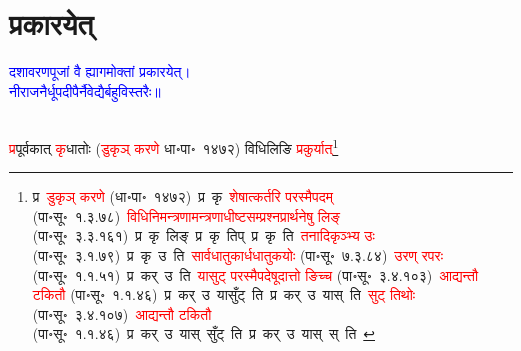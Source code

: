 \section[प्रकारयेत्]{प्रकारयेत्}
\centering\textcolor{blue}{दशावरणपूजां वै ह्यागमोक्तां प्रकारयेत्।\nopagebreak\\
नीराजनैर्धूपदीपैर्नैवेद्यैर्बहुविस्तरैः॥}\nopagebreak\\
\\
\fontsize{14}{21}\selectfont\begin{sloppypar}\justifying\noindent\hspace{10mm} \textcolor{red}{प्र}\-पूर्वकात् \textcolor{red}{कृ}\-धातोः (\textcolor{red}{डुकृञ् करणे} धा॰पा॰~१४७२) विधिलिङि \textcolor{red}{प्रकुर्यात्}\footnote{प्र~\textcolor{red}{डुकृञ् करणे} (धा॰पा॰~१४७२)~\arrow प्र~कृ~\arrow \textcolor{red}{शेषात्कर्तरि परस्मैपदम्} (पा॰सू॰~१.३.७८)~\arrow \textcolor{red}{विधि\-निमन्‍त्रणामन्‍त्रणाधीष्‍ट\-सम्प्रश्‍न\-प्रार्थनेषु लिङ्} (पा॰सू॰~३.३.१६१)~\arrow प्र~कृ~लिङ्~\arrow प्र~कृ~तिप्~\arrow प्र~कृ~ति~\arrow \textcolor{red}{तनादि\-कृञ्भ्य उः} (पा॰सू॰~३.१.७९)~\arrow प्र~कृ~उ~ति~\arrow \textcolor{red}{सार्वधातुकार्ध\-धातुकयोः} (पा॰सू॰~७.३.८४)~\arrow \textcolor{red}{उरण् रपरः} (पा॰सू॰~१.१.५१)~\arrow प्र~कर्~उ~ति~\arrow \textcolor{red}{यासुट् परस्मैपदेषूदात्तो ङिच्च} (पा॰सू॰~३.४.१०३)~\arrow \textcolor{red}{आद्यन्तौ टकितौ} (पा॰सू॰~१.१.४६)~\arrow प्र~कर्~उ~यासुँट्~ति~\arrow प्र~कर्~उ~यास्~ति~\arrow \textcolor{red}{सुट् तिथोः} (पा॰सू॰~३.४.१०७)~\arrow \textcolor{red}{आद्यन्तौ टकितौ} (पा॰सू॰~१.१.४६)~\arrow प्र~कर्~उ~यास्~सुँट्~ति~\arrow प्र~कर्~उ~यास्~स्~ति~\arrow 
}
\end{sloppypar}
